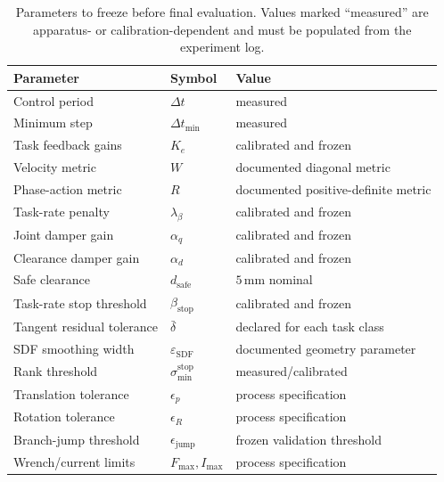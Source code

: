 \documentclass[preprint,12pt]{elsarticle}
\begin{document}
\begin{table}[h]
\centering
\caption{Parameters to freeze before final evaluation. Values marked ``measured'' are apparatus- or calibration-dependent and must be populated from the experiment log.}
\begin{tabular}{lll}
\toprule
Parameter & Symbol & Value \\
\midrule
Control period & $\Delta t$ & measured \\
Minimum step & $\Delta t_{\min}$ & measured \\
Task feedback gains & $K_e$ & calibrated and frozen \\
Velocity metric & $W$ & documented diagonal metric \\
Phase-action metric & $R$ & documented positive-definite metric \\
Task-rate penalty & $\lambda_\beta$ & calibrated and frozen \\
Joint damper gain & $\alpha_q$ & calibrated and frozen \\
Clearance damper gain & $\alpha_d$ & calibrated and frozen \\
Safe clearance & $d_{\mathrm{safe}}$ & $5\,\mathrm{mm}$ nominal \\
Task-rate stop threshold & $\beta_{\mathrm{stop}}$ & calibrated and frozen \\
Tangent residual tolerance & $\bar\delta$ & declared for each task class \\
SDF smoothing width & $\varepsilon_{\mathrm{SDF}}$ & documented geometry parameter \\
Rank threshold & $\sigma_{\min}^{\mathrm{stop}}$ & measured/calibrated \\
Translation tolerance & $\epsilon_p$ & process specification \\
Rotation tolerance & $\epsilon_R$ & process specification \\
Branch-jump threshold & $\epsilon_{\mathrm{jump}}$ & frozen validation threshold \\
Wrench/current limits & $F_{\max},I_{\max}$ & process specification \\
\bottomrule
\end{tabular}
\end{table}
\end{document}
